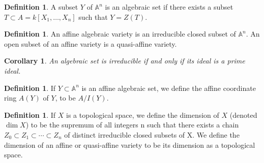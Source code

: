 \documentclass[11pt]{book}
\newtheorem{corollary}[theorem]{Corollary}
\theoremstyle{definition}
\newtheorem{definition}[theorem]{Definition}
\numberwithin{equation}{section}
\begin{document}
\begin{defbox}
    \begin{definition}
        A subset \(Y\) of \(\mathbb{A}^n\) is an algebraic set if there exists a subset \(T \subset A = k[X_1, \ldots, X_n]\) such that \(Y = Z(T)\).
    \end{definition}
\end{defbox}


\begin{defbox}
    \begin{definition}
        \label{def:algebraic_variety}
        An affine algebraic variety is an irreducible closed subset of \(\mathbb{A}^n\). An open subset of an affine variety is a quasi-affine variety.
    \end{definition}
\end{defbox}

\begin{thmbox}
\begin{corollary}
    \label{cor:ideal_correspondence}
    An algebraic set is irreducible if and only if its ideal is a prime ideal.
\end{corollary}
\end{thmbox}

\begin{defbox}
    \begin{definition}
        \label{def:affine_coordinate_ring}
        If \(Y \subset \mathbb{A}^n\) is an affine algebraic set, we define the affine coordinate ring \(A(Y)\) of \(Y\), to be \(A / I(Y)\). 
    \end{definition}
\end{defbox}

\begin{defbox}
    \begin{definition}
        \label{def:dimension_topological_space}
        If \(X\) is a topological space, we define the dimension of \(X\) (denoted
        \(\dim  X\)) to be the supremum of all integers n such that there exists a chain \(Z_0 \subset Z_1 \subset \cdots \subset Z_n\) of distinct irreducible closed subsets of X. We define the dimension of an affine or quasi-affine variety to be its dimension as a topological space. 
    \end{definition}
\end{defbox}
\end{document}
